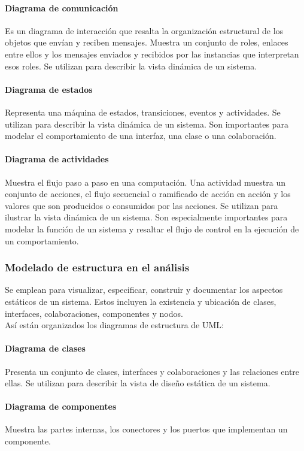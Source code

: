 \paragraph{Diagrama de comunicación}
Es un diagrama de interacción que resalta la organización estructural de los objetos que envían y reciben mensajes. Muestra un conjunto de roles, enlaces entre ellos y los mensajes enviados y recibidos por las instancias que interpretan esos roles. Se utilizan para describir la vista dinámica de un sistema.
\paragraph{Diagrama de estados}
Representa una máquina de estados, transiciones, eventos y actividades. Se utilizan para describir la vista dinámica de un sistema. Son importantes para modelar el comportamiento de una interfaz, una clase o una colaboración.
\paragraph{Diagrama de actividades}
Muestra el flujo paso a paso en una computación. Una actividad muestra un conjunto de acciones, el flujo secuencial o ramificado de acción en acción y los valores que son producidos o consumidos por las acciones. Se utilizan para ilustrar la vista dinámica de un sistema. Son especialmente importantes para modelar la función de un sistema y resaltar el flujo de control en la ejecución de un comportamiento.
\subsubsection{Modelado de estructura en el análisis}
Se emplean para visualizar, especificar, construir y documentar los aspectos estáticos de un sistema. Estos incluyen la existencia y ubicación de clases, interfaces, colaboraciones, componentes y nodos.\\
Así están organizados los diagramas de estructura de UML:
\paragraph{Diagrama de clases}
Presenta un conjunto de clases, interfaces y colaboraciones y las relaciones entre ellas. Se utilizan para describir la vista de diseño estática de un sistema.
\paragraph{Diagrama de componentes}
Muestra las partes internas, los conectores y los puertos que implementan un componente.
